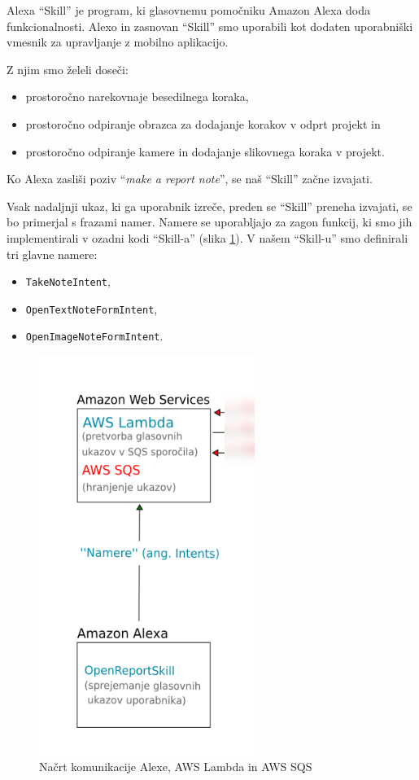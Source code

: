 \documentclass[a4paper, 12pt]{book}
\begin{document}
Alexa \enquote{Skill} je program, ki glasovnemu pomočniku Amazon Alexa doda funkcionalnosti.
Alexo in zasnovan \enquote{Skill} smo uporabili kot dodaten uporabniški vmesnik za upravljanje z mobilno aplikacijo.

\noindent Z njim smo želeli doseči:
\begin{itemize}
	\item prostoročno narekovnaje besedilnega koraka,
	\item prostoročno odpiranje obrazca za dodajanje korakov v odprt projekt in
	\item prostoročno odpiranje kamere in dodajanje slikovnega koraka v projekt.
\end{itemize}



Ko Alexa zasliši poziv \enquote{\textit{make a report note}}, se naš \enquote{Skill} začne izvajati.

Vsak nadaljnji ukaz, ki ga uporabnik izreče, preden se \enquote{Skill} preneha izvajati, se bo primerjal s frazami namer.
Namere se uporabljajo za zagon funkcij, ki smo jih implementirali v ozadni kodi \enquote{Skill-a} (slika \ref{plan_alexa_sqs}).
V našem \enquote{Skill-u} smo definirali tri glavne namere:

\begin{itemize}
	\item \texttt{TakeNoteIntent},
	\item \texttt{OpenTextNoteFormIntent},
	\item \texttt{OpenImageNoteFormIntent}.
\end{itemize}

\begin{figure}[H]
\begin{center}
\includegraphics[width=7cm]{plan_alexa_sqs}
\end{center}
\caption{Načrt komunikacije Alexe, AWS Lambda in AWS SQS}
\label{plan_alexa_sqs}
\end{figure}
\end{document}
